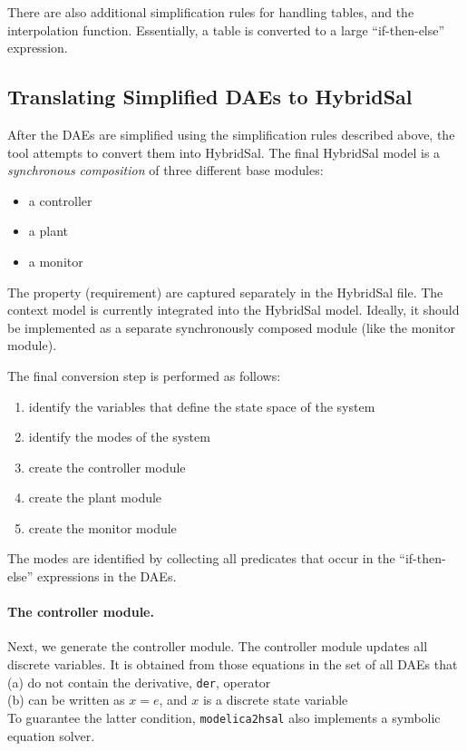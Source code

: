 \documentclass{llncs}
\begin{document}
There are also additional simplification rules for handling tables,
and the interpolation function.
Essentially, a table is converted to a large ``if-then-else'' expression.


\subsection{Translating Simplified DAEs to HybridSal}

After the DAEs are simplified using the simplification rules described above,
the tool attempts to convert them into HybridSal.
The final HybridSal model is a {\em{synchronous composition}} of three different
base modules:
\begin{itemize}
\item a controller 
\item a plant 
\item a monitor
\end{itemize}
The property (requirement) are captured separately in the HybridSal file.
The context model is currently integrated into the HybridSal model.
Ideally, it should be implemented as a separate synchronously composed module
(like the monitor module).

The final conversion step is performed as follows:
\begin{enumerate}
\item
identify the variables that define the state space of the system
\item
identify the modes of the system
\item
create the controller module
\item
create the plant module
\item
create the monitor module
\end{enumerate}
The modes are identified  by collecting all predicates that occur in the 
``if-then-else'' expressions in the DAEs.

\paragraph{The controller module.}
Next, we generate the controller module.  The controller module updates
all discrete variables.  It is obtained from those equations in the
set of all DAEs that 
\\
(a) do not contain the derivative, {\tt{der}}, operator
\\
(b) can be written as $x = e$, and $x$ is a discrete state variable
\\
To guarantee the latter condition,  {\tt{modelica2hsal}} also implements
a symbolic equation solver.
\end{document}
